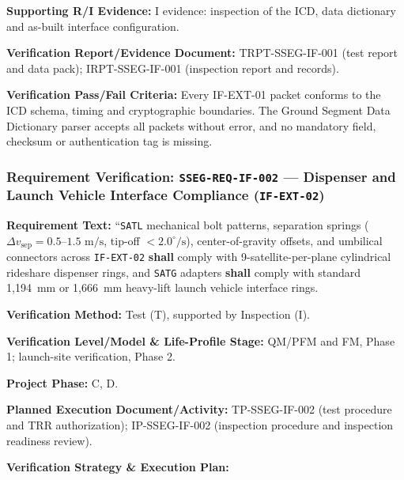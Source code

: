 \par\textbf{Supporting R/I Evidence:} I evidence: inspection of the ICD, data dictionary and as-built interface configuration.
\par\textbf{Verification Report/Evidence Document:} TRPT-SSEG-IF-001 (test report and data pack); IRPT-SSEG-IF-001 (inspection report and records).
\par\textbf{Verification Pass/Fail Criteria:} Every IF-EXT-01 packet conforms to the ICD schema, timing and cryptographic boundaries. The Ground Segment Data Dictionary parser accepts all packets without error, and no mandatory field, checksum or authentication tag is missing.
\par\medskip
\subsubsection{Requirement Verification: \texttt{SSEG-REQ-IF-002} --- Dispenser and Launch Vehicle Interface Compliance (\texttt{IF-EXT-02})}
\label{ver:SSEG-REQ-IF-002}
\textbf{Requirement Text:} ``\texttt{SATL} mechanical bolt patterns, separation springs ($\Delta v_{\text{sep}} = 0.5\text{--}1.5\text{ m/s}$, tip-off $< 2.0^\circ/\text{s}$), center-of-gravity offsets, and umbilical connectors across \texttt{IF-EXT-02} \textbf{shall} comply with 9-satellite-per-plane cylindrical rideshare dispenser rings, and \texttt{SATG} adapters \textbf{shall} comply with standard 1,194~mm or 1,666~mm heavy-lift launch vehicle interface rings.
\par\textbf{Verification Method:} Test (T), supported by Inspection (I).
\par\textbf{Verification Level/Model \& Life-Profile Stage:} QM/PFM and FM, Phase 1; launch-site verification, Phase 2.
\par\textbf{Project Phase:} C, D.
\par\textbf{Planned Execution Document/Activity:} TP-SSEG-IF-002 (test procedure and TRR authorization); IP-SSEG-IF-002 (inspection procedure and inspection readiness review).
\par\textbf{Verification Strategy \& Execution Plan:}

